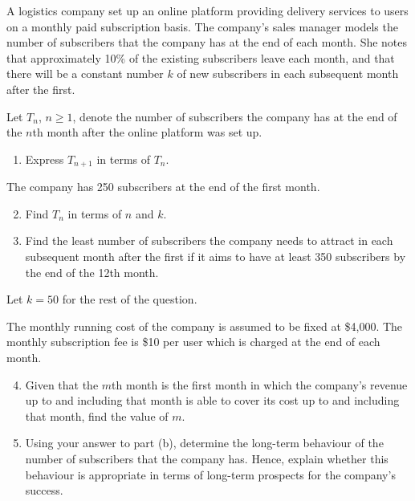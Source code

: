 \begin{problem}
    A logistics company set up an online platform providing delivery services to users on a monthly paid subscription basis. The company's sales manager models the number of subscribers that the company has at the end of each month. She notes that approximately 10\% of the existing subscribers leave each month, and that there will be a constant number $k$ of new subscribers in each subsequent month after the first.

    Let $T_n$, $n \geq 1$, denote the number of subscribers the company has at the end of the $n$th month after the online platform was set up.

    \begin{enumerate}
        \item Express $T_{n+1}$ in terms of $T_n$.
    \end{enumerate}

    The company has 250 subscribers at the end of the first month.

    \begin{enumerate}
        \setcounter{enumi}{1}
        \item Find $T_n$ in terms of $n$ and $k$.
        \item Find the least number of subscribers the company needs to attract in each subsequent month after the first if it aims to have at least 350 subscribers by the end of the 12th month.
    \end{enumerate}

    Let $k = 50$ for the rest of the question.

    The monthly running cost of the company is assumed to be fixed at \$4,000. The monthly subscription fee is \$10 per user which is charged at the end of each month.

    \begin{enumerate}
        \setcounter{enumi}{3}
        \item Given that the $m$th month is the first month in which the company's revenue up to and including that month is able to cover its cost up to and including that month, find the value of $m$.
        \item Using your answer to part (b), determine the long-term behaviour of the number of subscribers that the company has. Hence, explain whether this behaviour is appropriate in terms of long-term prospects for the company's success.    
    \end{enumerate}
\end{problem}
